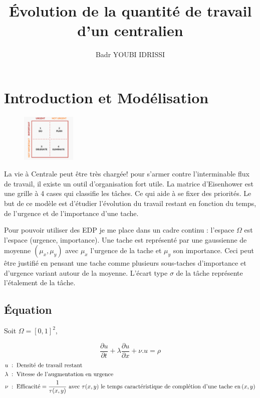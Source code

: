 \documentclass[french]{article}
\author{Badr YOUBI IDRISSI}
\title{\'Evolution de la quantité de travail d'un centralien}
\begin{document}
\maketitle
\section{Introduction et Modélisation}

    \begin{figure}
        \begin{center}
            \includegraphics[width=0.23\textwidth]{Figures/Eisenhower.png}
        \end{center}
    \end{figure}
    La vie à Centrale peut être très chargée! pour s'armer contre l'interminable 
    flux de travail, il existe un outil d'organisation fort utile.
    La matrice d'Eisenhower est une grille à 4 cases qui classifie les tâches. Ce qui 
    aide à se fixer des priorités. Le but de ce modèle est d'étudier
    l'évolution du travail restant en fonction du temps, de l'urgence et de l'importance d'une
     tache.
    
    Pour pouvoir utiliser des EDP je me place dans un cadre continu : l'espace $\Omega$ est
     l'espace (urgence, importance). Une tache est représenté par 
    une gaussienne de moyenne $(\mu_x,\mu_y)$ avec $\mu_x$ l'urgence de la tache et
     $\mu_y$ son importance.
    Ceci peut être justifié en pensant une tache comme plusieurs sous-taches
     d'importance et d'urgence variant
    autour de la moyenne. L'écart type $\sigma$ de la tâche représente l'étalement de la tâche.

    \subsection{\'Equation}
    Soit $\Omega = [0,1]^2$,
    
    \begin{equation}\label{EDP}
        \frac{\partial u}{\partial t} + \lambda\frac{\partial u}{\partial x} + \nu.u = \rho 
    \end{equation}
    \begin{alignat*}{6}
        u \;:\; &\text{\;Densité de travail restant} \\
        \lambda \;:\; &\text{\;Vitesse de l'augmentation en urgence}\\
        \nu \;:\; &
        \text{\;Efficacité} = \frac{1}{\tau(x,y)} \text{ avec } \tau(x,y) 
        \text{ le temps caractéristique de complétion d'une tache en} \,(x,y)
    \end{alignat*}
\end{document}
